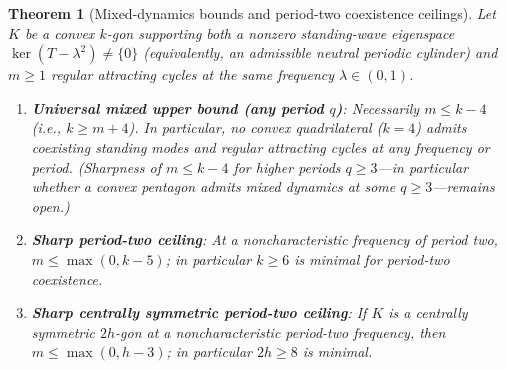 \documentclass[11pt,reqno]{amsart}
\newtheorem{theorem}{Theorem}[section]
\theoremstyle{definition}
\theoremstyle{remark}
\begin{document}
\begin{theorem}[Mixed-dynamics bounds and period-two coexistence ceilings]\label{thm:mixed-bounds}
Let $K$ be a convex $k$-gon supporting both a nonzero standing-wave eigenspace $\ker(T-\lambda^2) \ne \{0\}$ (equivalently, an admissible neutral periodic cylinder) and $m \ge 1$ regular attracting cycles at the same frequency $\lambda \in (0,1)$.
\begin{enumerate}
  \item \textbf{Universal mixed upper bound (any period $q$)}: Necessarily $m \le k - 4$ (i.e., $k \ge m + 4$). In particular, \emph{no convex quadrilateral ($k = 4$) admits coexisting standing modes and regular attracting cycles at any frequency or period}. (Sharpness of $m \le k - 4$ for higher periods $q \ge 3$---in particular whether a convex pentagon admits mixed dynamics at some $q \ge 3$---remains open.)
  \item \textbf{Sharp period-two ceiling}: At a noncharacteristic frequency of period two, $m \le \max(0, k - 5)$; in particular $k \ge 6$ is minimal for period-two coexistence.
  \item \textbf{Sharp centrally symmetric period-two ceiling}: If $K$ is a centrally symmetric $2h$-gon at a noncharacteristic period-two frequency, then $m \le \max(0, h - 3)$; in particular $2h \ge 8$ is minimal.
\end{enumerate}
\end{theorem}
\end{document}
